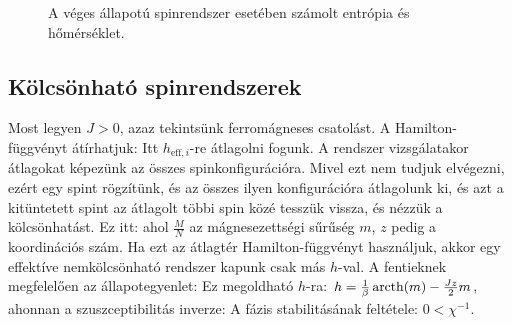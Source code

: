    \begin{figure}[ht!]
    \centering
     \hspace{6pt}
    \caption{A véges állapotú spinrendszer esetében számolt entrópia és hőmérséklet.}\label{fig:B08-NegT}
   \end{figure}
   
   
    
  \subsection{Kölcsönható spinrendszerek}
   
   Most legyen $J>0$, azaz tekintsünk ferromágneses csatolást. A Hamilton-függvényt átírhatjuk:
   Itt $h_{\text{eff},i}$-re átlagolni fogunk. A rendszer vizsgálatakor átlagokat képezünk az összes spinkonfigurációra. Mivel ezt nem tudjuk elvégezni, ezért egy spint rögzítünk, és az összes ilyen konfigurációra átlagolunk ki, és azt a kitüntetett spint az átlagolt többi spin közé tesszük vissza, és nézzük a kölcsönhatást. Ez itt:
   ahol $\frac{M}{N}$ az mágnesezettségi sűrűség $m$, $z$ pedig a koordinációs szám. Ha ezt az átlagtér Hamilton-függvényt használjuk, akkor egy effektíve nemkölcsönható rendszer kapunk csak más $h$-val. A fentieknek megfelelően az állapotegyenlet:
   Ez megoldható $h$-ra: $h=\frac{1}{\beta}\mathop{\mathrm{arcth}}\nolimits(m)-\frac{Jz}{2}m$, ahonnan a szuszceptibilitás inverze:
   A fázis stabilitásának feltétele: $0<\chi^{-1}$. 
   
